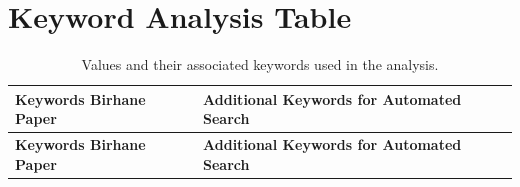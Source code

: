 \documentclass{article}
\begin{document}
\appendix

\section{Keyword Analysis Table}

\begin{longtable}{|p{5cm}|p{10cm}|} 
    \caption{Values and their associated keywords used in the analysis.} \\
    \hline
    \textbf{Keywords Birhane Paper} & \textbf{Additional Keywords for Automated Search} \\
    \hline
    \endfirsthead

    \hline
    \textbf{Keywords Birhane Paper} & \textbf{Additional Keywords for Automated Search} \\
    \hline
    \endhead
    

\end{longtable}
\end{document}
